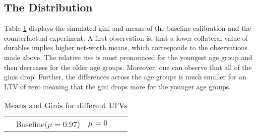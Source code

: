 \documentclass[a4paper,12pt,legno]{article}
\begin{document}
\subsection{The Distribution}
Table \ref{ginis_means_LTV} displays the simulated gini and means of the baseline calibration and the counterfactual experiment. A first observation is, that a lower collateral value of durables implies higher net-worth means, which corresponds to the observations made above. The relative rise is most pronounced for the youngest age group and then decreases for the older age groups. 
Moreover, one can observe that all of the ginis drop. Further, the differences across the age groups is much smaller for an LTV of zero meaning that the gini drops more for the younger age groups.


\begin{table}[!htbp]
\centering
\caption{Means and Ginis for different LTVs}
\label{ginis_means_LTV}
\begin{tabular}{@{}lllll@{}}
\toprule
                                                                                 & Baseline($\mu = 0.97$) & $\mu = 0$
                                                                 

\end{tabular}
\end{table}
\end{document}
